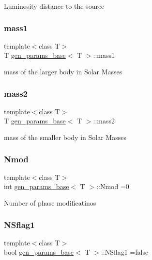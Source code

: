 Luminosity distance to the source \mbox{\label{classgen__params__base_a8e7626a0841f4d2224b625e327f7679a}} 
\subsubsection{\texorpdfstring{mass1}{mass1}}
{\footnotesize\ttfamily template$<$class T$>$ \\
T \hyperlink{classgen__params__base}{gen\+\_\+params\+\_\+base}$<$ T $>$\+::mass1}

mass of the larger body in Solar Masses \mbox{\label{classgen__params__base_a8bb568ea6c20f9442a5fd0f1b01344e0}} 
\subsubsection{\texorpdfstring{mass2}{mass2}}
{\footnotesize\ttfamily template$<$class T$>$ \\
T \hyperlink{classgen__params__base}{gen\+\_\+params\+\_\+base}$<$ T $>$\+::mass2}

mass of the smaller body in Solar Masses \mbox{\label{classgen__params__base_adce2e842deae1db65c22fbc74cc9b7ed}} 
\subsubsection{\texorpdfstring{Nmod}{Nmod}}
{\footnotesize\ttfamily template$<$class T$>$ \\
int \hyperlink{classgen__params__base}{gen\+\_\+params\+\_\+base}$<$ T $>$\+::Nmod =0}

Number of phase modificatinos \mbox{\label{classgen__params__base_a03398714fe7005a9c80336733c9a2043}} 
\subsubsection{\texorpdfstring{N\+Sflag1}{NSflag1}}
{\footnotesize\ttfamily template$<$class T$>$ \\
bool \hyperlink{classgen__params__base}{gen\+\_\+params\+\_\+base}$<$ T $>$\+::N\+Sflag1 =false}


